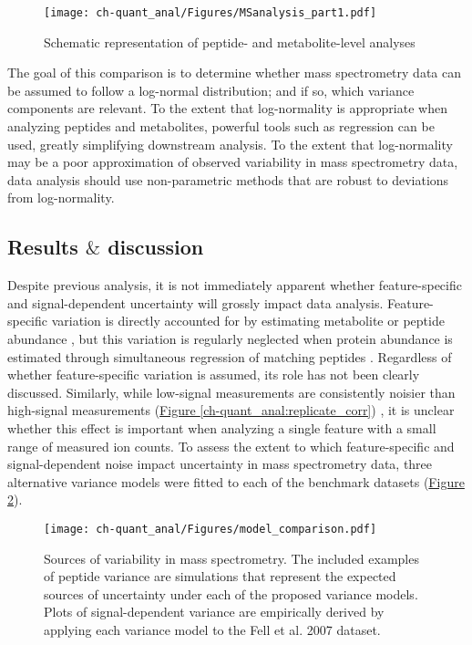 \begin{figure}[h!]
\begin{center}
\texttt{[image: ch-quant\_anal/Figures/MSanalysis\_part1.pdf]}
\caption[Schematic representation of peptide-level and metabolite-level analyses]{Schematic representation of peptide- and metabolite-level analyses}
\label{ch-quant_anal:MSworkflow_p1}
\end{center}
\end{figure}

The goal of this comparison is to determine whether mass spectrometry data can be assumed to follow a log-normal distribution; and if so, which variance components are relevant. To the extent that log-normality is appropriate when analyzing peptides and metabolites, powerful tools such as regression can be used, greatly simplifying downstream analysis. To the extent that log-normality may be a poor approximation of observed variability in mass spectrometry data, data analysis should use non-parametric methods that are robust to deviations from log-normality.

\subsection{Results $\&$ discussion}

Despite previous analysis, it is not immediately apparent whether feature-specific and signal-dependent uncertainty will grossly impact data analysis. Feature-specific variation is directly accounted for by estimating metabolite or peptide abundance \cite{Costenoble:2011hia, Boer:2010fb}, but this variation is regularly neglected when protein abundance is estimated through simultaneous regression of matching peptides \cite{Oberg:2012bm}. Regardless of whether feature-specific variation is assumed, its role has not been clearly discussed. Similarly, while low-signal measurements are consistently noisier than high-signal measurements (\hyperref[ch-quant_anal:replicate_corr]{Figure \ref{ch-quant_anal:replicate_corr}}) \cite{Zhu:2011jr,Oberg:2012bm,Navarro:2014ke}, it is unclear whether this effect is important when analyzing a single feature with a small range of measured ion counts. To assess the extent to which feature-specific and signal-dependent noise impact uncertainty in mass spectrometry data, three alternative variance models were fitted to each of the benchmark datasets (\hyperref[ch-quant_anal:modelComparison]{Figure \ref{ch-quant_anal:modelComparison}}). 

\begin{figure}[h!]
\begin{center}
\texttt{[image: ch-quant\_anal/Figures/model\_comparison.pdf]}
\caption[Sources of variability in mass spectrometry]{Sources of variability in mass spectrometry. The included examples of peptide variance are simulations that represent the expected sources of uncertainty under each of the proposed variance models. Plots of signal-dependent variance are empirically derived by applying each variance model to the Fell et al. 2007 dataset.}
\label{ch-quant_anal:modelComparison}
\end{center}
\end{figure}

